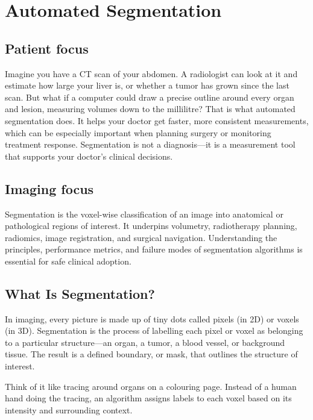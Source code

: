 \chapter{Automated Segmentation}

\section*{Patient focus}
Imagine you have a CT scan of your abdomen. A radiologist can look at it and estimate how large your liver is, or whether a tumor has grown since the last scan. But what if a computer could draw a precise outline around every organ and lesion, measuring volumes down to the millilitre? That is what automated segmentation does. It helps your doctor get faster, more consistent measurements, which can be especially important when planning surgery or monitoring treatment response. Segmentation is not a diagnosis---it is a measurement tool that supports your doctor's clinical decisions.

\section*{Imaging focus}
Segmentation is the voxel-wise classification of an image into anatomical or pathological regions of interest. It underpins volumetry, radiotherapy planning, radiomics, image registration, and surgical navigation. Understanding the principles, performance metrics, and failure modes of segmentation algorithms is essential for safe clinical adoption.
\label{ch:ch86_segmentation}

\section{What Is Segmentation?}
In imaging, every picture is made up of tiny dots called pixels (in 2D) or voxels (in 3D). Segmentation is the process of labelling each pixel or voxel as belonging to a particular structure---an organ, a tumor, a blood vessel, or background tissue. The result is a defined boundary, or mask, that outlines the structure of interest.

Think of it like tracing around organs on a colouring page. Instead of a human hand doing the tracing, an algorithm assigns labels to each voxel based on its intensity and surrounding context.

